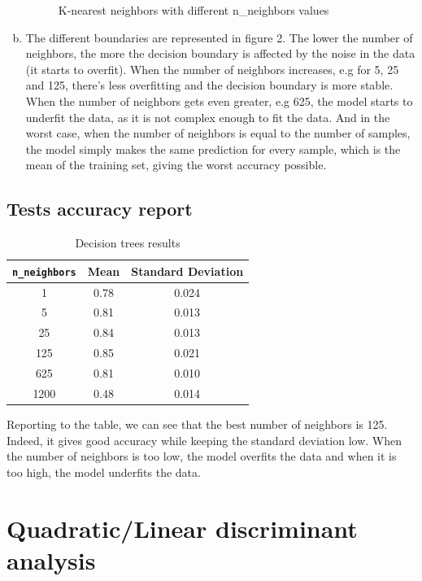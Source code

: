 \documentclass[12pt]{article}
\begin{document}
\begin{enumerate}[a)]
\begin{figure}[H]
			\caption{K-nearest neighbors with different n\_neighbors values}
			\label{fig:knn}
		\end{figure}
		\item 
		The different boundaries are represented in figure 2. The lower the number of neighbors, the more the decision boundary is affected by the noise in the data (it starts to overfit). 
		When the number of neighbors increases, e.g for 5, 25 and 125, there's less overfitting and the decision boundary is more stable.
		When the number of neighbors gets even greater, e.g 625, the model starts to underfit the data, as it is not complex enough to fit the data.
		And in the worst case, when the number of neighbors is equal to the number of samples, the model simply makes the same prediction for every sample, which is the mean of the training set, giving the worst accuracy possible.
	\end{enumerate}
\subsection{Tests accuracy report}
	\begin{table}[!h]
		\centering
		\begin{tabular}{|c|c|c|}
		\hline
		\verb|n_neighbors|               & Mean & Standard Deviation \\ \hline
		1                                & 0.78 & 0.024              \\ \hline
		5                                & 0.81 & 0.013              \\ \hline
		25                               & 0.84 & 0.013              \\ \hline
		125                              & 0.85 & 0.021              \\ \hline
		625                              & 0.81 & 0.010              \\ \hline
		1200                             & 0.48 & 0.014              \\ \hline

		\end{tabular}
		\caption{Decision trees results}
		\label{tab:results-knn}
	\end{table}
Reporting to the table, we can see that the best number of neighbors is 125. 
Indeed, it gives good accuracy while keeping the standard deviation low. 
When the number of neighbors is too low, the model overfits the data and when it is too high, the model underfits the data.


\section{Quadratic/Linear discriminant analysis}
\end{document}
